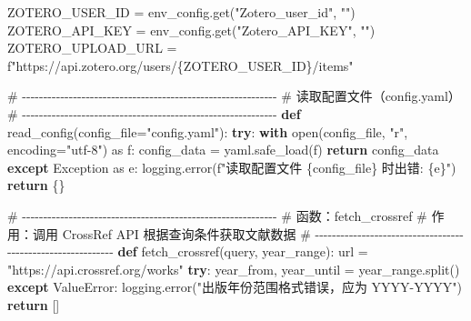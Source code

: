 \documentclass[
  letterpaper,
  DIV=11,
  numbers=noendperiod]{scrreprt}
\newenvironment{Shaded}{\begin{snugshade}}{\end{snugshade}}
\newcommand{\BuiltInTok}[1]{\textcolor[rgb]{0.00,0.23,0.31}{#1}}
\newcommand{\CommentTok}[1]{\textcolor[rgb]{0.37,0.37,0.37}{#1}}
\newcommand{\ControlFlowTok}[1]{\textcolor[rgb]{0.00,0.23,0.31}{\textbf{#1}}}
\newcommand{\ImportTok}[1]{\textcolor[rgb]{0.00,0.46,0.62}{#1}}
\newcommand{\KeywordTok}[1]{\textcolor[rgb]{0.00,0.23,0.31}{\textbf{#1}}}
\newcommand{\NormalTok}[1]{\textcolor[rgb]{0.00,0.23,0.31}{#1}}
\newcommand{\OperatorTok}[1]{\textcolor[rgb]{0.37,0.37,0.37}{#1}}
\newcommand{\PreprocessorTok}[1]{\textcolor[rgb]{0.68,0.00,0.00}{#1}}
\newcommand{\SpecialCharTok}[1]{\textcolor[rgb]{0.37,0.37,0.37}{#1}}
\newcommand{\SpecialStringTok}[1]{\textcolor[rgb]{0.13,0.47,0.30}{#1}}
\newcommand{\StringTok}[1]{\textcolor[rgb]{0.13,0.47,0.30}{#1}}
\begin{document}
\begin{Shaded}
\begin{Highlighting}[]
\NormalTok{ZOTERO\_USER\_ID }\OperatorTok{=}\NormalTok{ env\_config.get(}\StringTok{"Zotero\_user\_id"}\NormalTok{, }\StringTok{""}\NormalTok{)}
\NormalTok{ZOTERO\_API\_KEY }\OperatorTok{=}\NormalTok{ env\_config.get(}\StringTok{"Zotero\_API\_KEY"}\NormalTok{, }\StringTok{""}\NormalTok{)}
\NormalTok{ZOTERO\_UPLOAD\_URL }\OperatorTok{=} \SpecialStringTok{f"https://api.zotero.org/users/}\SpecialCharTok{\{}\NormalTok{ZOTERO\_USER\_ID}\SpecialCharTok{\}}\SpecialStringTok{/items"}

\CommentTok{\# {-}{-}{-}{-}{-}{-}{-}{-}{-}{-}{-}{-}{-}{-}{-}{-}{-}{-}{-}{-}{-}{-}{-}{-}{-}{-}{-}{-}{-}{-}{-}{-}{-}{-}{-}{-}{-}{-}{-}{-}{-}{-}{-}{-}{-}{-}{-}{-}{-}{-}{-}{-}{-}{-}{-}{-}{-}{-}{-}{-}}
\CommentTok{\# 读取配置文件（config.yaml）}
\CommentTok{\# {-}{-}{-}{-}{-}{-}{-}{-}{-}{-}{-}{-}{-}{-}{-}{-}{-}{-}{-}{-}{-}{-}{-}{-}{-}{-}{-}{-}{-}{-}{-}{-}{-}{-}{-}{-}{-}{-}{-}{-}{-}{-}{-}{-}{-}{-}{-}{-}{-}{-}{-}{-}{-}{-}{-}{-}{-}{-}{-}{-}}
\KeywordTok{def}\NormalTok{ read\_config(config\_file}\OperatorTok{=}\StringTok{"config.yaml"}\NormalTok{):}
    \ControlFlowTok{try}\NormalTok{:}
        \ControlFlowTok{with} \BuiltInTok{open}\NormalTok{(config\_file, }\StringTok{"r"}\NormalTok{, encoding}\OperatorTok{=}\StringTok{"utf{-}8"}\NormalTok{) }\ImportTok{as}\NormalTok{ f:}
\NormalTok{            config\_data }\OperatorTok{=}\NormalTok{ yaml.safe\_load(f)}
            \ControlFlowTok{return}\NormalTok{ config\_data}
    \ControlFlowTok{except} \PreprocessorTok{Exception} \ImportTok{as}\NormalTok{ e:}
\NormalTok{        logging.error(}\SpecialStringTok{f"读取配置文件 }\SpecialCharTok{\{}\NormalTok{config\_file}\SpecialCharTok{\}}\SpecialStringTok{ 时出错: }\SpecialCharTok{\{}\NormalTok{e}\SpecialCharTok{\}}\SpecialStringTok{"}\NormalTok{)}
        \ControlFlowTok{return}\NormalTok{ \{\}}

\CommentTok{\# {-}{-}{-}{-}{-}{-}{-}{-}{-}{-}{-}{-}{-}{-}{-}{-}{-}{-}{-}{-}{-}{-}{-}{-}{-}{-}{-}{-}{-}{-}{-}{-}{-}{-}{-}{-}{-}{-}{-}{-}{-}{-}{-}{-}{-}{-}{-}{-}{-}{-}{-}{-}{-}{-}{-}{-}{-}{-}{-}{-}}
\CommentTok{\# 函数：fetch\_crossref}
\CommentTok{\# 作用：调用 CrossRef API 根据查询条件获取文献数据}
\CommentTok{\# {-}{-}{-}{-}{-}{-}{-}{-}{-}{-}{-}{-}{-}{-}{-}{-}{-}{-}{-}{-}{-}{-}{-}{-}{-}{-}{-}{-}{-}{-}{-}{-}{-}{-}{-}{-}{-}{-}{-}{-}{-}{-}{-}{-}{-}{-}{-}{-}{-}{-}{-}{-}{-}{-}{-}{-}{-}{-}{-}{-}}
\KeywordTok{def}\NormalTok{ fetch\_crossref(query, year\_range):}
\NormalTok{    url }\OperatorTok{=} \StringTok{"https://api.crossref.org/works"}
    \ControlFlowTok{try}\NormalTok{:}
\NormalTok{        year\_from, year\_until }\OperatorTok{=}\NormalTok{ year\_range.split(}\StringTok{\textquotesingle{}{-}\textquotesingle{}}\NormalTok{)}
    \ControlFlowTok{except} \PreprocessorTok{ValueError}\NormalTok{:}
\NormalTok{        logging.error(}\StringTok{"出版年份范围格式错误，应为 \textquotesingle{}YYYY{-}YYYY\textquotesingle{}"}\NormalTok{)}
        \ControlFlowTok{return}\NormalTok{ []}


\end{Highlighting}
\end{Shaded}
\end{document}
